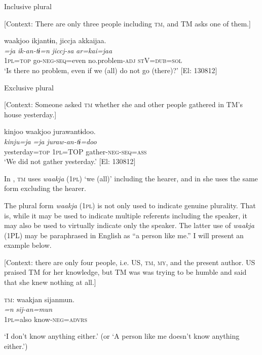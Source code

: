 \ea \label{ex:5:7}  \ea \label{ex:5:7a} Inclusive plural

    [Context: There are only three people including \textsc{tm}, and TM asks one of them.]

\glll  waakjoo  ikjantɨn,  jiccja  akkaijaa.\\
\textit{=ja}  \textit{ik-an-tɨ=n}  \textit{jiccj-sa}  \textit{ar=kai=jaa}\\
1\textsc{pl}=\textsc{top}  go-\textsc{neg}-\textsc{seq}=even  no.problem-\textsc{adj}  \textsc{st}V=\textsc{dub}=\textsc{sol}\\
\glt ‘Is there no problem, even if we (all) do not go (there)?’ [El: 130812]

 \ex \label{ex:5:7b} Exclusive plural

    [Context: Someone asked \textsc{tm} whether she and other people gathered in TM’s house yesterday.]

\glll  kinjoo  waakjoo  jurawantɨdoo.\\
\textit{kinju=ja}  \textit{=ja}  \textit{juraw-an-tɨ=doo}\\
yesterday=\textsc{top}  1\textsc{pl}=TOP  gather-\textsc{neg}-\textsc{seq}=\textsc{ass}\\
\glt ‘We did not gather yesterday.’ [El: 130812]
\z
\z

\noindent In , \textsc{tm} uses \textit{waakja} (1\textsc{pl}) ‘we (all)’ including the hearer, and in  she uses the same form excluding the hearer.

The plural form \textit{waakja} (1\textsc{pl}) is not only used to indicate genuine plurality. That is, while it may be used to indicate multiple referents including the speaker, it may also be used to virtually indicate only the speaker. The latter use of \textit{waakja} (1PL) may be paraphrased in English as “a person like me.” I will present an example below.

\ea \label{ex:5:8}   [Context: there are only four people, i.e. US, \textsc{tm}, \textsc{my}, and the present author. US praised TM for her knowledge, but TM was was trying to be humble and said that she knew nothing at all.]

  \textsc{tm}: \glll  waakjan  sijanmun.\\
    \textit{=n}  \textit{sij-an=mun}\\
    1\textsc{pl}=also  know-\textsc{neg}=\textsc{advrs}\\
    \glt {} \parbox{\linewidth-\widthof{TM:}}{‘I don’t know anything either.’ (or ‘A person like me doesn’t know anything either.’)}

